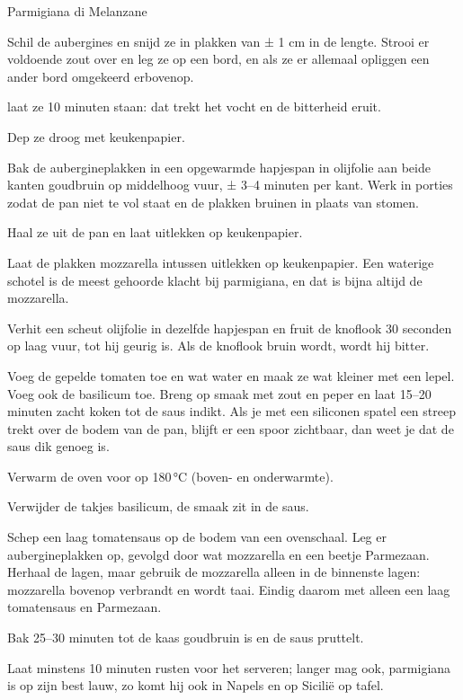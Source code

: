 \begin{recipe}{Parmigiana di Melanzane}
\begin{steps}
  \item Schil de aubergines en snijd ze in plakken van ± 1 cm in de lengte. Strooi er voldoende zout over en
        leg ze op een bord, en als ze er allemaal opliggen een ander bord omgekeerd erbovenop.
  \item laat ze 10 minuten staan: dat trekt het vocht en de bitterheid eruit. 
  \item Dep ze droog met keukenpapier.
  \item Bak de aubergineplakken in een opgewarmde hapjespan in olijfolie aan beide kanten goudbruin op middelhoog vuur,
        ± 3--4 minuten per kant. Werk in porties zodat de pan niet te vol staat en de plakken bruinen
        in plaats van stomen. 
  \item Haal ze uit de pan en laat uitlekken op keukenpapier.
  \item Laat de plakken mozzarella intussen uitlekken op keukenpapier. Een
        waterige schotel is de meest gehoorde klacht bij parmigiana, en dat is
        bijna altijd de mozzarella.
  \item Verhit een scheut olijfolie in dezelfde hapjespan en fruit de knoflook 30 seconden op
        laag vuur, tot hij geurig is. Als de knoflook bruin wordt, wordt hij bitter.
  \item Voeg de gepelde tomaten toe en wat water en maak ze wat kleiner met een lepel. Voeg ook de basilicum toe.
        Breng op smaak met zout en peper en laat 15--20 minuten zacht koken tot de saus indikt. 
        Als je met een siliconen spatel een streep trekt over de bodem van de pan, blijft er een spoor zichtbaar,
        dan weet je dat de saus dik genoeg is.
  \item Verwarm de oven voor op 180\,°C (boven- en onderwarmte). 
  \item Verwijder de takjes basilicum, de smaak zit in de saus.
  \item Schep een laag tomatensaus op de bodem van een ovenschaal. Leg er aubergineplakken
        op, gevolgd door wat mozzarella en een beetje Parmezaan. Herhaal de lagen, maar
        gebruik de mozzarella alleen in de binnenste lagen: mozzarella bovenop verbrandt
        en wordt taai. Eindig daarom met alleen een laag tomatensaus en Parmezaan.
  \item Bak 25--30 minuten tot de kaas goudbruin is en de saus pruttelt.
  \item Laat minstens 10 minuten rusten voor het serveren; langer mag ook, parmigiana is
        op zijn best lauw, zo komt hij ook in Napels en op Sicilië op tafel.
\end{steps}

\end{recipe}
